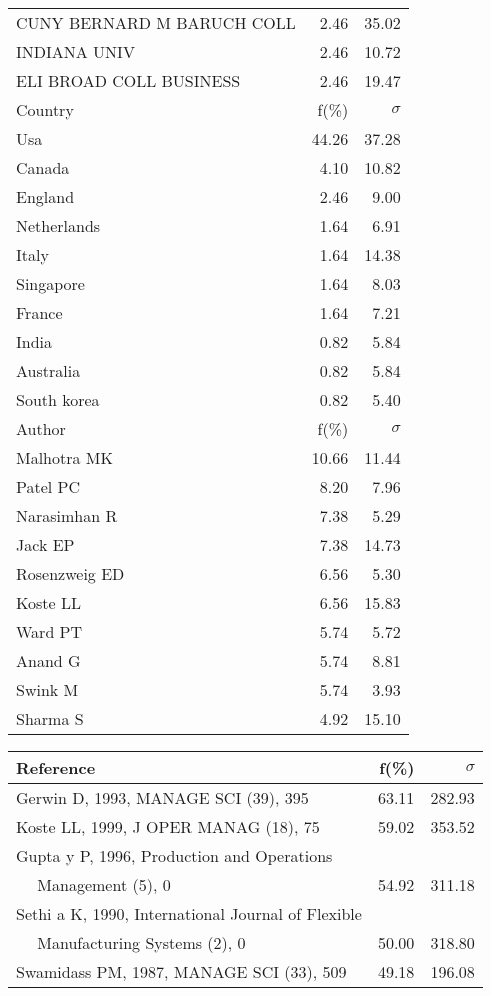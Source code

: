 \documentclass[a4paper,11pt]{report}
\begin{document}
\begin{landscape}
\begin{table}[!ht]
{\begin{tabular}{|l r r|}
CUNY BERNARD M BARUCH COLL & 2.46 & 35.02\\
INDIANA UNIV & 2.46 & 10.72\\
ELI BROAD COLL BUSINESS & 2.46 & 19.47\\
\hline
\hline
Country & f(\%) & $\sigma$\\
\hline
Usa & 44.26 & 37.28\\
Canada & 4.10 & 10.82\\
England & 2.46 & 9.00\\
Netherlands & 1.64 & 6.91\\
Italy & 1.64 & 14.38\\
Singapore & 1.64 & 8.03\\
France & 1.64 & 7.21\\
India & 0.82 & 5.84\\
Australia & 0.82 & 5.84\\
South korea & 0.82 & 5.40\\
\hline
\hline
Author & f(\%) & $\sigma$\\
\hline
Malhotra MK & 10.66 & 11.44\\
Patel PC & 8.20 & 7.96\\
Narasimhan R & 7.38 & 5.29\\
Jack EP & 7.38 & 14.73\\
Rosenzweig ED & 6.56 & 5.30\\
Koste LL & 6.56 & 15.83\\
Ward PT & 5.74 & 5.72\\
Anand G & 5.74 & 8.81\\
Swink M & 5.74 & 3.93\\
Sharma S & 4.92 & 15.10\\
\hline
\end{tabular}
}
{\scriptsize\begin{tabular}{|l r r|}
\hline
Reference & f(\%) & $\sigma$\\
\hline
Gerwin D, 1993, MANAGE SCI (39), 395 & 63.11 & 282.93\\
Koste LL, 1999, J OPER MANAG (18), 75 & 59.02 & 353.52\\
Gupta y P, 1996, Production and Operations &  & \\
$\quad$ Management (5), 0 & 54.92 & 311.18\\
Sethi a K, 1990, International Journal of Flexible &  & \\
$\quad$ Manufacturing Systems (2), 0 & 50.00 & 318.80\\
Swamidass PM, 1987, MANAGE SCI (33), 509 & 49.18 & 196.08\\

\end{tabular}}
\end{table}
\end{landscape}
\end{document}
